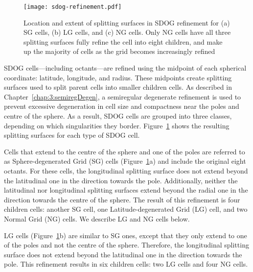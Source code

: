 \begin{figure}[ht!]
	\centering
	\texttt{[image: sdog-refinement.pdf]}
	\caption[Title]{
		Location and extent of splitting surfaces in SDOG refinement for (a) SG cells, (b) LG cells, and (c) NG cells.
		Only NG cells have all three splitting surfaces fully refine the cell into eight children, and make up the majority of cells as the grid becomes increasingly refined
	}
	\label{fig:sdog-refinement}
\end{figure}


SDOG cells---including octants---are refined using the midpoint of each spherical coordinate: latitude, longitude, and radius.
These midpoints create splitting surfaces used to split parent cells into smaller children cells.
As described in Chapter~\ref{chap:3:semiregDegen}, a semiregular degenerate refinement is used to prevent excessive degeneration in cell size and compactness near the poles and centre of the sphere.
As a result, SDOG cells are grouped into three classes, depending on which singularities they border.
Figure~\ref{fig:sdog-refinement} shows the resulting splitting surfaces for each type of SDOG cell.


Cells that extend to the centre of the sphere and one of the poles are referred to as Sphere-degenerated Grid (SG) cells (Figure~\ref{fig:sdog-refinement}a) and include the original eight octants.
For these cells, the longitudinal splitting surface does not extend beyond the latitudinal one in the direction towards the pole.
Additionally, neither the latitudinal nor longitudinal splitting surfaces extend beyond the radial one in the direction towards the centre of the sphere.
The result of this refinement is four children cells: another SG cell, one Latitude-degenerated Grid (LG) cell, and two Normal Grid (NG) cells.
We describe LG and NG cells below.


LG cells (Figure~\ref{fig:sdog-refinement}b) are similar to SG ones, except that they only extend to one of the poles and not the centre of the sphere.
Therefore, the longitudinal splitting surface does not extend beyond the latitudinal one in the direction towards the pole.
This refinement results in six children cells: two LG cells and four NG cells.



